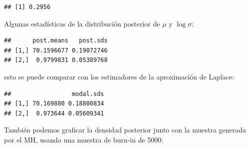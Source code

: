 \documentclass[
  12pt,
]{book}
\newenvironment{Shaded}{\begin{snugshade}}{\end{snugshade}}
\newcommand{\AttributeTok}[1]{\textcolor[rgb]{0.77,0.63,0.00}{#1}}
\newcommand{\DecValTok}[1]{\textcolor[rgb]{0.00,0.00,0.81}{#1}}
\newcommand{\FloatTok}[1]{\textcolor[rgb]{0.00,0.00,0.81}{#1}}
\newcommand{\FunctionTok}[1]{\textcolor[rgb]{0.00,0.00,0.00}{#1}}
\newcommand{\NormalTok}[1]{#1}
\newcommand{\OtherTok}[1]{\textcolor[rgb]{0.56,0.35,0.01}{#1}}
\newcommand{\SpecialCharTok}[1]{\textcolor[rgb]{0.00,0.00,0.00}{#1}}
\newcommand{\StringTok}[1]{\textcolor[rgb]{0.31,0.60,0.02}{#1}}
\begin{document}
\begin{verbatim}
## [1] 0.2956
\end{verbatim}

Algunas estadísticas de la distribución posterior de \(\mu\) y
\(\log \sigma\):

\begin{Shaded}
\end{Shaded}

\begin{verbatim}
##      post.means   post.sds
## [1,] 70.1596677 0.19072746
## [2,]  0.9799831 0.05389768
\end{verbatim}

esto se puede comparar con los estimadores de la aproximación de
Laplace:

\begin{Shaded}
\end{Shaded}

\begin{verbatim}
##                 modal.sds
## [1,] 70.169880 0.18800834
## [2,]  0.973644 0.05609341
\end{verbatim}

También podemos graficar la densidad posterior junto con la muestra
generada por el MH, usando una muestra de burn-in de 5000:

\begin{Shaded}
\end{Shaded}
\end{document}
